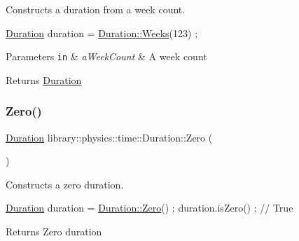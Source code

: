 Constructs a duration from a week count. 


\begin{DoxyCode}
\hyperlink{classlibrary_1_1physics_1_1time_1_1_duration_a0a70efcf487a841da572afcf00001f64}{Duration} duration = \hyperlink{classlibrary_1_1physics_1_1time_1_1_duration_ae9d507f6cbb36902529b28d3721507c1}{Duration::Weeks}(123) ;
\end{DoxyCode}



\begin{DoxyParams}[1]{Parameters}
\mbox{\tt in}  & {\em a\+Week\+Count} & A week count \\
\hline
\end{DoxyParams}
\begin{DoxyReturn}{Returns}
\hyperlink{classlibrary_1_1physics_1_1time_1_1_duration}{Duration} 
\end{DoxyReturn}
\mbox{\label{classlibrary_1_1physics_1_1time_1_1_duration_aa68c3998cd4cf9068fb239dd66102c2c}} 
\subsubsection{\texorpdfstring{Zero()}{Zero()}}
{\footnotesize\ttfamily \hyperlink{classlibrary_1_1physics_1_1time_1_1_duration}{Duration} library\+::physics\+::time\+::\+Duration\+::\+Zero (\begin{DoxyParamCaption}{ }\end{DoxyParamCaption})\hspace{0.3cm}{\ttfamily [static]}}



Constructs a zero duration. 


\begin{DoxyCode}
\hyperlink{classlibrary_1_1physics_1_1time_1_1_duration_a0a70efcf487a841da572afcf00001f64}{Duration} duration = \hyperlink{classlibrary_1_1physics_1_1time_1_1_duration_aa68c3998cd4cf9068fb239dd66102c2c}{Duration::Zero}() ;
duration.isZero() ; \textcolor{comment}{// True}
\end{DoxyCode}


\begin{DoxyReturn}{Returns}
Zero duration 
\end{DoxyReturn}


